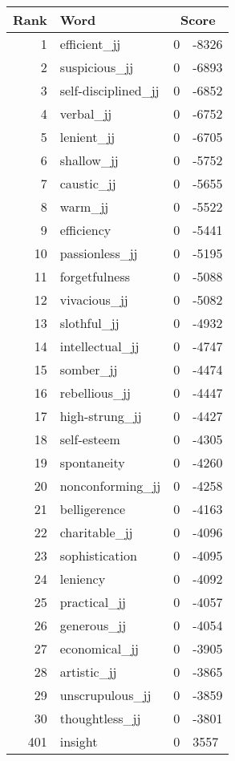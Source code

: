 \begin{longtable}[!htbp]{| rlr@{.}l |}
    \hline
    \textbf{Rank} & \textbf{Word} & \multicolumn{2}{c|}{\textbf{Score}} \\
    \hline
    \endhead
    1 & efficient\_jj & 0 & -8326 \\
    2 & suspicious\_jj & 0 & -6893 \\
    3 & self-disciplined\_jj & 0 & -6852 \\
    4 & verbal\_jj & 0 & -6752 \\
    5 & lenient\_jj & 0 & -6705 \\
    6 & shallow\_jj & 0 & -5752 \\
    7 & caustic\_jj & 0 & -5655 \\
    8 & warm\_jj & 0 & -5522 \\
    9 & efficiency & 0 & -5441 \\
    10 & passionless\_jj & 0 & -5195 \\
    11 & forgetfulness & 0 & -5088 \\
    12 & vivacious\_jj & 0 & -5082 \\
    13 & slothful\_jj & 0 & -4932 \\
    14 & intellectual\_jj & 0 & -4747 \\
    15 & somber\_jj & 0 & -4474 \\
    16 & rebellious\_jj & 0 & -4447 \\
    17 & high-strung\_jj & 0 & -4427 \\
    18 & self-esteem & 0 & -4305 \\
    19 & spontaneity & 0 & -4260 \\
    20 & nonconforming\_jj & 0 & -4258 \\
    21 & belligerence & 0 & -4163 \\
    22 & charitable\_jj & 0 & -4096 \\
    23 & sophistication & 0 & -4095 \\
    24 & leniency & 0 & -4092 \\
    25 & practical\_jj & 0 & -4057 \\
    26 & generous\_jj & 0 & -4054 \\
    27 & economical\_jj & 0 & -3905 \\
    28 & artistic\_jj & 0 & -3865 \\
    29 & unscrupulous\_jj & 0 & -3859 \\
    30 & thoughtless\_jj & 0 & -3801 \\
    401 & insight & 0 & 3557 \\

\end{longtable}
